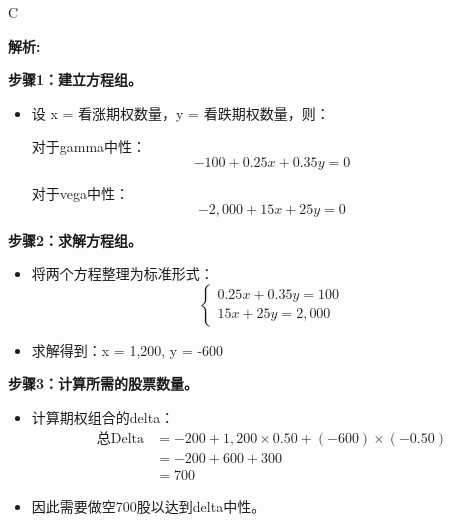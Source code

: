 \documentclass{article}
\newenvironment{explanation}
{\textbf{解析:}\par}
{\par}
\begin{document}
            \begin{correctanswer}
            C
            \end{correctanswer}
            
            \begin{explanation}
            
            \textbf{步骤1：建立方程组。}
            \begin{itemize}
                \item 设 x = 看涨期权数量，y = 看跌期权数量，则：
                
                对于gamma中性：
                \[
                -100 + 0.25x + 0.35y = 0
                \]
            
                对于vega中性：
                \[
                -2,000 + 15x + 25y = 0
                \]
            \end{itemize}
            
            \textbf{步骤2：求解方程组。}
            \begin{itemize}
                \item 将两个方程整理为标准形式：
                \[
                \begin{cases}
                0.25x + 0.35y = 100 \\
                15x + 25y = 2,000
                \end{cases}
            \]
            
                \item 求解得到：x = 1,200, y = -600
            \end{itemize}
            
            \textbf{步骤3：计算所需的股票数量。}
            \begin{itemize}
                \item 计算期权组合的delta：
                \[
                \begin{aligned}
                \text{总Delta} &= -200 + 1,200 \times 0.50 + (-600) \times (-0.50) \\
                &= -200 + 600 + 300 \\
                &= 700
                \end{aligned}
                \]
            \item 因此需要做空700股以达到delta中性。
            \end{itemize}
            
            \end{explanation}
            
\end{document}

